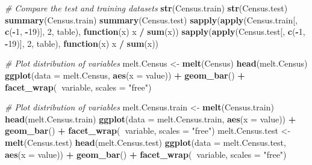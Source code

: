 \documentclass[]{book}
\newenvironment{Shaded}{\begin{snugshade}}{\end{snugshade}}
\newcommand{\KeywordTok}[1]{\textcolor[rgb]{0.13,0.29,0.53}{\textbf{#1}}}
\newcommand{\DataTypeTok}[1]{\textcolor[rgb]{0.13,0.29,0.53}{#1}}
\newcommand{\DecValTok}[1]{\textcolor[rgb]{0.00,0.00,0.81}{#1}}
\newcommand{\StringTok}[1]{\textcolor[rgb]{0.31,0.60,0.02}{#1}}
\newcommand{\CommentTok}[1]{\textcolor[rgb]{0.56,0.35,0.01}{\textit{#1}}}
\newcommand{\ControlFlowTok}[1]{\textcolor[rgb]{0.13,0.29,0.53}{\textbf{#1}}}
\newcommand{\OperatorTok}[1]{\textcolor[rgb]{0.81,0.36,0.00}{\textbf{#1}}}
\newcommand{\NormalTok}[1]{#1}
\begin{document}
\begin{Shaded}
\begin{Highlighting}[]
\CommentTok{# Compare the test and training datasets}
\KeywordTok{str}\NormalTok{(Census.train)}
\KeywordTok{str}\NormalTok{(Census.test)}
\KeywordTok{summary}\NormalTok{(Census.train)}
\KeywordTok{summary}\NormalTok{(Census.test)}
\KeywordTok{sapply}\NormalTok{(}\KeywordTok{apply}\NormalTok{(Census.train[, }\KeywordTok{c}\NormalTok{(}\OperatorTok{-}\DecValTok{1}\NormalTok{, }\OperatorTok{-}\DecValTok{19}\NormalTok{)], }\DecValTok{2}\NormalTok{, table), }\ControlFlowTok{function}\NormalTok{(x) x }\OperatorTok{/}\StringTok{ }\KeywordTok{sum}\NormalTok{(x))}
\KeywordTok{sapply}\NormalTok{(}\KeywordTok{apply}\NormalTok{(Census.test[, }\KeywordTok{c}\NormalTok{(}\OperatorTok{-}\DecValTok{1}\NormalTok{, }\OperatorTok{-}\DecValTok{19}\NormalTok{)], }\DecValTok{2}\NormalTok{, table), }\ControlFlowTok{function}\NormalTok{(x) x }\OperatorTok{/}\StringTok{ }\KeywordTok{sum}\NormalTok{(x))}

\CommentTok{# Plot distribution of variables}
\NormalTok{melt.Census <-}\StringTok{ }\KeywordTok{melt}\NormalTok{(Census)}
\KeywordTok{head}\NormalTok{(melt.Census)}
\KeywordTok{ggplot}\NormalTok{(}\DataTypeTok{data =}\NormalTok{ melt.Census, }\KeywordTok{aes}\NormalTok{(}\DataTypeTok{x =}\NormalTok{ value)) }\OperatorTok{+}
\StringTok{  }\KeywordTok{geom_bar}\NormalTok{() }\OperatorTok{+}
\StringTok{  }\KeywordTok{facet_wrap}\NormalTok{(}\OperatorTok{~}\NormalTok{variable, }\DataTypeTok{scales =} \StringTok{"free"}\NormalTok{)}

\CommentTok{# Plot distribution of variables}
\NormalTok{melt.Census.train <-}\StringTok{ }\KeywordTok{melt}\NormalTok{(Census.train)}
\KeywordTok{head}\NormalTok{(melt.Census.train)}
\KeywordTok{ggplot}\NormalTok{(}\DataTypeTok{data =}\NormalTok{ melt.Census.train, }\KeywordTok{aes}\NormalTok{(}\DataTypeTok{x =}\NormalTok{ value)) }\OperatorTok{+}
\StringTok{  }\KeywordTok{geom_bar}\NormalTok{() }\OperatorTok{+}
\StringTok{  }\KeywordTok{facet_wrap}\NormalTok{(}\OperatorTok{~}\NormalTok{variable, }\DataTypeTok{scales =} \StringTok{"free"}\NormalTok{)}
\NormalTok{melt.Census.test <-}\StringTok{ }\KeywordTok{melt}\NormalTok{(Census.test)}
\KeywordTok{head}\NormalTok{(melt.Census.test)}
\KeywordTok{ggplot}\NormalTok{(}\DataTypeTok{data =}\NormalTok{ melt.Census.test, }\KeywordTok{aes}\NormalTok{(}\DataTypeTok{x =}\NormalTok{ value)) }\OperatorTok{+}
\StringTok{  }\KeywordTok{geom_bar}\NormalTok{() }\OperatorTok{+}
\StringTok{  }\KeywordTok{facet_wrap}\NormalTok{(}\OperatorTok{~}\NormalTok{variable, }\DataTypeTok{scales =} \StringTok{"free"}\NormalTok{)}
\end{Highlighting}
\end{Shaded}
\end{document}
